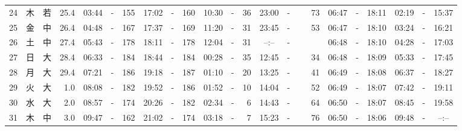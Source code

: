 \documentclass[12pt,a4j]{jsarticle}
\begin{document}
\begin{table}[htbp]
\begin{center}
{\begin{tabular}{|rc|cr|ccrccr|ccrccr|ccc|ccc|}
24 & 木 & 若 & 25.4 &  03:44 &-& 155 &  17:02 &-& 160 &  10:30 &-&  36 &  23:00 &-&  73 & 06:47 & -& 18:11 & 02:19 & -& 15:37 \\
25 & 金 & 中 & 26.4 &  04:48 &-& 167 &  17:37 &-& 169 &  11:20 &-&  31 &  23:45 &-&  53 & 06:47 & -& 18:10 & 03:24 & -& 16:21 \\
26 & 土 & 中 & 27.4 &  05:43 &-& 178 &  18:11 &-& 178 &  12:04 &-&  31 &  --:-- &-&~~~~~ & 06:48 & -& 18:10 & 04:28 & -& 17:03 \\
27 & 日 & 大 & 28.4 &  06:33 &-& 184 &  18:44 &-& 184 &  00:28 &-&  35 &  12:45 &-&  34 & 06:48 & -& 18:09 & 05:33 & -& 17:45 \\
28 & 月 & 大 & 29.4 &  07:21 &-& 186 &  19:18 &-& 187 &  01:10 &-&  20 &  13:25 &-&  41 & 06:49 & -& 18:08 & 06:37 & -& 18:27 \\
29 & 火 & 大 &  1.0 &  08:08 &-& 182 &  19:52 &-& 186 &  01:52 &-&  10 &  14:04 &-&  52 & 06:49 & -& 18:07 & 07:42 & -& 19:11 \\
30 & 水 & 大 &  2.0 &  08:57 &-& 174 &  20:26 &-& 182 &  02:34 &-&   6 &  14:43 &-&  64 & 06:50 & -& 18:07 & 08:45 & -& 19:58 \\
31 & 木 & 中 &  3.0 &  09:47 &-& 162 &  21:02 &-& 174 &  03:18 &-&   7 &  15:23 &-&  76 & 06:50 & -& 18:06 & 09:48 & -& --:-- \\
   \hline
   \end{tabular}}
   \end{center}
\end{table}
\newpage
\end{document}

